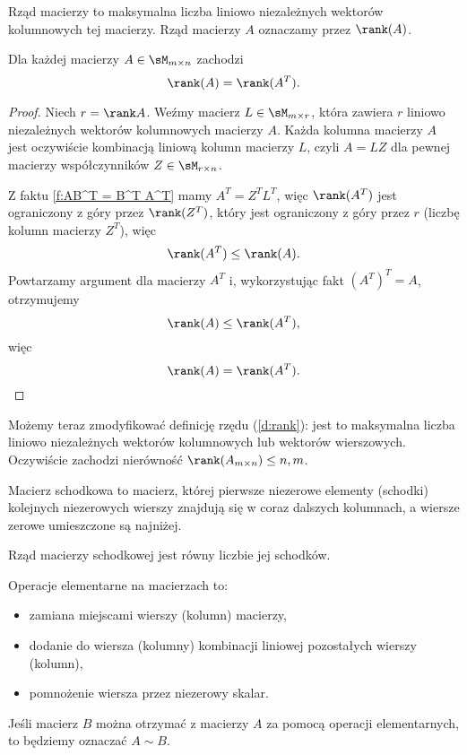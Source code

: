 \begin{definition}
    \label{d:rank}
    Rząd macierzy to maksymalna liczba liniowo niezależnych wektorów kolumnowych tej macierzy. Rząd macierzy $A$ oznaczamy przez $\rank (A)$.
\end{definition}

\begin{theorem}
    Dla każdej macierzy $A \in \sM_{m\times n}$ zachodzi
    \[ \rank(A) = \rank(A^T). \]
\end{theorem}
\begin{proof}
    Niech $r = \rank A$. Weźmy macierz $L \in \sM_{m\times r}$, która zawiera $r$ liniowo niezależnych wektorów kolumnowych macierzy $A$. Każda kolumna macierzy $A$ jest oczywiście kombinacją liniową kolumn macierzy $L$, czyli $A = LZ$ dla pewnej macierzy współczynników $Z \in \sM_{r\times n}$.

    Z faktu \ref{f:AB^T = B^T A^T} mamy $A^T = Z^TL^T$, więc $\rank (A^T)$ jest ograniczony z góry przez $\rank(Z^T)$, który jest ograniczony z góry przez $r$ (liczbę kolumn macierzy $Z^T$), więc
    \[ \rank(A^T) \leq \rank(A). \]
    Powtarzamy argument dla macierzy $A^T$ i, wykorzystując fakt $(A^T)^T = A$, otrzymujemy
    \[ \rank(A) \leq \rank(A^T), \]
    więc
    \[ \rank(A) = \rank(A^T). \]
\end{proof}

Możemy teraz zmodyfikować definicję rzędu (\ref{d:rank}): jest to maksymalna liczba liniowo niezależnych wektorów kolumnowych lub wektorów wierszowych. Oczywiście zachodzi nierówność $\rank (A_{m\times n}) \leq n, m$.

\begin{definition}
    Macierz schodkowa to macierz, której pierwsze niezerowe elementy (schodki) kolejnych niezerowych wierszy znajdują się w coraz dalszych kolumnach, a wiersze zerowe umieszczone są najniżej.
\end{definition}

\begin{fact}
    Rząd macierzy schodkowej jest równy liczbie jej schodków.
\end{fact}

\begin{definition}
    Operacje elementarne na macierzach to:
    \begin{itemize}
        \item zamiana miejscami wierszy (kolumn) macierzy,
        \item dodanie do wiersza (kolumny) kombinacji liniowej pozostałych wierszy (kolumn),
        \item pomnożenie wiersza przez niezerowy skalar.
    \end{itemize}
    Jeśli macierz $B$ można otrzymać z macierzy $A$ za pomocą operacji elementarnych, to będziemy oznaczać $A \sim B$.
\end{definition}

